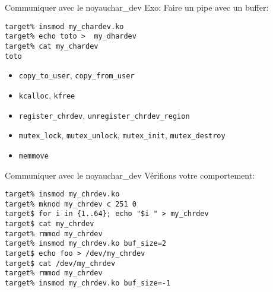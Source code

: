 \begin{frame}[fragile=singleslide]{Communiquer avec le noyau}{char\_dev}
  Exo: Faire un pipe avec un buffer:
  \begin{lstlisting}
target% insmod my_chardev.ko
target% echo toto >  my_dhardev
target% cat my_chardev
toto
  \end{lstlisting}
  \begin{itemize}
  \item \verb+copy_to_user+, \verb+copy_from_user+
  \item \verb+kcalloc+, \verb+kfree+
  \item \verb+register_chrdev+, \verb+unregister_chrdev_region+
  \item   \verb+mutex_lock+,  \verb+mutex_unlock+,  \verb+mutex_init+,
    \verb+mutex_destroy+
  \item \verb+memmove+
  \end{itemize}
\end{frame}

\begin{frame}[fragile=singleslide]{Communiquer avec le noyau}{char\_dev}
   Vérifions votre comportement:
   \begin{lstlisting}
target% insmod my_chrdev.ko
target% mknod my_chrdev c 251 0
target$ for i in {1..64}; echo "$i " > my_chrdev
target$ cat my_chrdev
target% rmmod my_chrdev
target% insmod my_chrdev.ko buf_size=2
target$ echo foo > /dev/my_chrdev
target$ cat /dev/my_chrdev
target% rmmod my_chrdev
target% insmod my_chrdev.ko buf_size=-1
    \end{lstlisting} %
\end{frame}
 

